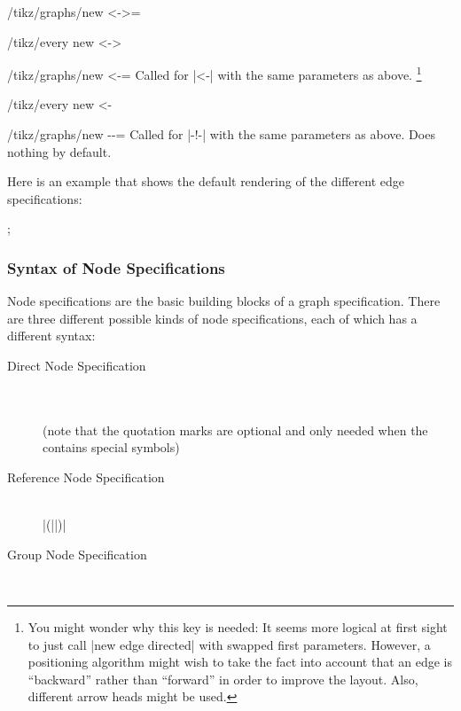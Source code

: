 \begin{enumerate}
\begin{key}{/tikz/graphs/new <->=}
\begin{stylekey}{/tikz/every new <->}
    \end{stylekey}
  \end{key}
  \begin{key}{/tikz/graphs/new <-=}
    Called for |<-| with the same parameters as above.%
    \footnote{You might
      wonder why this key is needed: It seems more logical at first
      sight to just call |new edge directed| with swapped first
      parameters. However, a positioning
      algorithm might wish to take the fact into account that an edge is
      ``backward'' rather than ``forward''  in order to
      improve the layout. Also, different arrow heads might be used.}
    \begin{stylekey}{/tikz/every new <-}
    \end{stylekey}
  \end{key}
  \begin{key}{/tikz/graphs/new -\protect\exclamationmarktext-=}
    Called for |-!-| with the same parameters as above. Does nothing
    by default.
  \end{key}
\end{enumerate}

Here is an example that shows the default rendering of the different
edge specifications:

\begin{codeexample}[]
\tikz {};  
\end{codeexample}



\subsubsection{Syntax of Node Specifications}

\label{section-library-graphs-node-spec}

Node specifications are the basic building blocks of a graph
specification. There are three different possible kinds of node
specifications, each of which has a different syntax: 

\begin{description}
\item[Direct Node Specification]
  \ \\
   \\
  (note that the quotation marks are optional and only needed when the
   contains special symbols)
\item[Reference Node Specification]
  \ \\
  |(||)|
\item[Group Node Specification]
  \ \\
\end{description}

